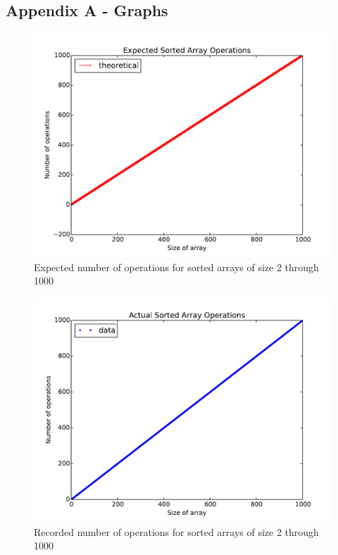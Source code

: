 \documentclass{article}
\begin{document}
    \subsection{Appendix A - Graphs}
        \begin{figure}[h]
            \includegraphics[width=\textwidth, height=0.4\textheight]{sorted_array_basic_operation_count_expected}
            \caption{Expected number of operations for sorted arrays of size 2 through 1000}
        \end{figure}
        \begin{figure}[h]
            \includegraphics[width=\textwidth, height=0.4\textheight]{sorted_array_basic_operation_count_data}
            \caption{Recorded number of operations for sorted arrays of size 2 through 1000}
        \end{figure}
\end{document}
